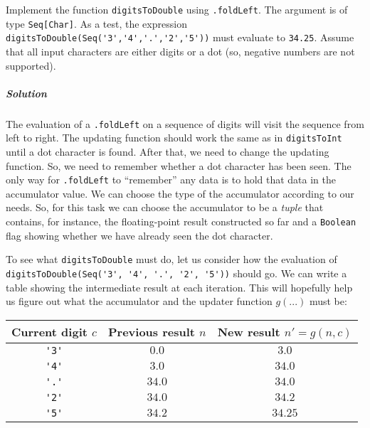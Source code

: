 Implement the function \lstinline!digitsToDouble! using \lstinline!.foldLeft!.
The argument is of type \lstinline!Seq[Char]!. As a test, the expression
\lstinline!digitsToDouble(Seq('3','4','.','2','5'))! must evaluate
to \lstinline!34.25!. Assume that all input characters are either
digits or a dot (so, negative numbers are not supported).

\subparagraph{Solution}

The evaluation of a \lstinline!.foldLeft! on a sequence of digits
will visit the sequence from left to right. The updating function
should work the same as in \lstinline!digitsToInt! until a dot character
is found. After that, we need to change the updating function. So,
we need to remember whether a dot character has been seen. The only
way for \lstinline!.foldLeft! to ``remember'' any data is to hold
that data in the accumulator value. We can choose the type of the
accumulator according to our needs. So, for this task we can choose
the accumulator to be a \emph{tuple} that contains, for instance,
the floating-point result constructed so far and a \lstinline!Boolean!
flag showing whether we have already seen the dot character.

To see what \lstinline!digitsToDouble! must do, let us consider how
the evaluation of \lstinline!digitsToDouble(Seq('3', '4', '.', '2', '5'))!
should go. We can write a table showing the intermediate result at
each iteration. This will hopefully help us figure out what the accumulator
and the updater function $g(...)$ must be:
\begin{center}
\begin{tabular}{|c|c|c|}
\hline 
\textbf{\small{}Current digit $c$} & \textbf{\small{}Previous result $n$} & \textbf{\small{}New result $n'=g(n,c)$}\tabularnewline
\hline 
\hline 
\lstinline!'3'! & {\small{}$0.0$} & {\small{}$3.0$}\tabularnewline
\hline 
\lstinline!'4'! & {\small{}$3.0$} & {\small{}$34.0$}\tabularnewline
\hline 
\lstinline!'.'! & {\small{}$34.0$} & {\small{}$34.0$}\tabularnewline
\hline 
\lstinline!'2'! & {\small{}$34.0$} & {\small{}$34.2$}\tabularnewline
\hline 
\lstinline!'5'! & {\small{}$34.2$} & {\small{}$34.25$}\tabularnewline
\hline 
\end{tabular}
\par\end{center}

